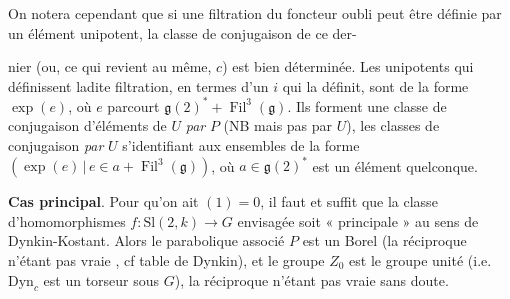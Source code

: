 \documentclass[11pt,a4paper]{article}
\begin{document}
On notera cependant que si une filtration du foncteur oubli peut être définie
par un élément unipotent, la classe de conjugaison de ce der-

nier (ou, ce qui revient au même, $c$) est bien déterminée. Les unipotents qui
définissent ladite filtration, en termes d'un $i$ qui la définit, sont
 de la forme $\exp(e)$, où $e$ parcourt
$\mathfrak{g}(2)^{*}+\operatorname{Fil}^{3}(\mathfrak{g})$. Ils forment une
classe de conjugaison d'éléments de $U$ \emph{par} $P$ (NB mais pas par $U$),
les classes de conjugaison \emph{par} $U$ s'identifiant aux ensembles de la
forme $(\exp(e)\,|\,e\in a+\operatorname{Fil}^{3}(\mathfrak{g}))$, où
$a\in\mathfrak{g}(2)^{*}$ est un élément quelconque.

\textbf{Cas principal}. Pour qu'on ait \ill{}$(1)=0$, il faut et suffit que
la classe d'homomorphismes $f\colon\mathrm{Sl}(2,k)\to G$ envisagée soit
« principale » au sens de Dynkin-Kostant. Alors le parabolique associé $P$ est
un Borel (la réciproque n'étant pas vraie , cf table de
Dynkin), et le groupe $Z_0$ est le groupe unité (i.e.\ $\mathrm{Dyn}_c$ est un
torseur sous $G$), la réciproque n'étant pas vraie sans doute.
\end{document}

